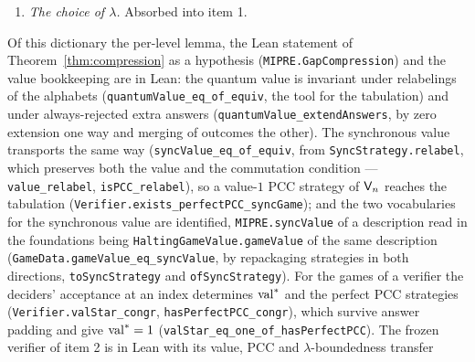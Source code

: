 \begin{remark}
\begin{enumerate}
  was never going to supply; and the separate soundness clause that used to stand beside it
  --- that the description does not \emph{overshoot}, forcing the diagonal tuples to reject
  being a lowering of the value --- is deleted, the soundness branch of
  Theorem~\ref{thm:halting} taking the equality of values instead. The tabulation itself is
  read with the answer alphabet enumerated by \texttt{Verifier.answerEquiv} and the doubled
  question alphabet by \texttt{Verifier.tagEquiv}, a tag bit prepended to the point's bit
  string, and a description matching the doubled game along those indexings has the value of
  $\verifier_n$ (\texttt{quantumValue\_toGame\_eq\_valStar\_doubled}), which is what carries
  the verdict of a procedure that runs on game descriptions back to the verifier. The same
  transport in $\synval$ is \texttt{Verifier.syncValue\_syncGame\_eq\_one\_doubled}, which is
  what item 1 of Theorem~\ref{thm:halting} needs; see the end of this remark.
\item \emph{The choice of $\lambda$.} Absorbed into item 1.
\end{enumerate}
Of this dictionary the per-level lemma, the Lean statement of
Theorem~\ref{thm:compression} as a hypothesis (\texttt{MIPRE.GapCompression}) and the
value bookkeeping are in Lean: the quantum value is invariant under relabelings of the
alphabets (\texttt{quantumValue\_eq\_of\_equiv}, the tool for the tabulation) and under
always-rejected extra answers (\texttt{quantumValue\_extendAnswers}, by zero extension one
way and merging of outcomes the other). The synchronous value transports the same way
(\texttt{syncValue\_eq\_of\_equiv}, from \texttt{SyncStrategy.relabel}, which preserves both
the value and the commutation condition --- \texttt{value\_relabel},
\texttt{isPCC\_relabel}), so a value-$1$ PCC strategy of $\verifier_n$ reaches the tabulation
(\texttt{Verifier.exists\_perfectPCC\_syncGame}); and the two vocabularies for the
synchronous value are identified, \texttt{MIPRE.syncValue} of a description read in the
foundations being \texttt{HaltingGameValue.gameValue} of the same description
(\texttt{GameData.gameValue\_eq\_syncValue}, by repackaging strategies in both directions,
\texttt{toSyncStrategy} and \texttt{ofSyncStrategy}). For the games of a verifier the deciders'
acceptance at an index determines $\mathrm{val}^*$ and the perfect PCC strategies
(\texttt{Verifier.valStar\_congr}, \texttt{hasPerfectPCC\_congr}), which survive answer
padding and give $\mathrm{val}^* = 1$ (\texttt{valStar\_eq\_one\_of\_hasPerfectPCC}). The frozen
verifier of item 2 is in Lean with its value, PCC and $\lambda$-boundedness transfer

\end{remark}
